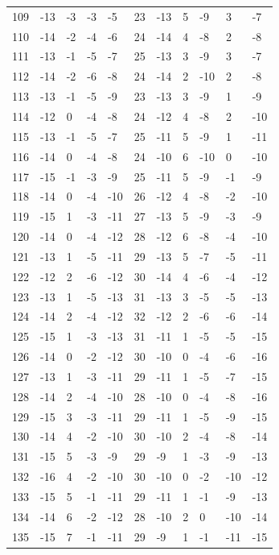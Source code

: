 \begin{table}[H]
\begin{tabular}{lllllllllll}
109 & -13 & -3 & -3 & -5 & 23 & -13 & 5 & -9 & 3 & -7 \\
110 & -14 & -2 & -4 & -6 & 24 & -14 & 4 & -8 & 2 & -8 \\
111 & -13 & -1 & -5 & -7 & 25 & -13 & 3 & -9 & 3 & -7 \\
112 & -14 & -2 & -6 & -8 & 24 & -14 & 2 & -10 & 2 & -8 \\
113 & -13 & -1 & -5 & -9 & 23 & -13 & 3 & -9 & 1 & -9 \\
114 & -12 & 0 & -4 & -8 & 24 & -12 & 4 & -8 & 2 & -10 \\
115 & -13 & -1 & -5 & -7 & 25 & -11 & 5 & -9 & 1 & -11 \\
116 & -14 & 0 & -4 & -8 & 24 & -10 & 6 & -10 & 0 & -10 \\
117 & -15 & -1 & -3 & -9 & 25 & -11 & 5 & -9 & -1 & -9 \\
118 & -14 & 0 & -4 & -10 & 26 & -12 & 4 & -8 & -2 & -10 \\
119 & -15 & 1 & -3 & -11 & 27 & -13 & 5 & -9 & -3 & -9 \\
120 & -14 & 0 & -4 & -12 & 28 & -12 & 6 & -8 & -4 & -10 \\
121 & -13 & 1 & -5 & -11 & 29 & -13 & 5 & -7 & -5 & -11 \\
122 & -12 & 2 & -6 & -12 & 30 & -14 & 4 & -6 & -4 & -12 \\
123 & -13 & 1 & -5 & -13 & 31 & -13 & 3 & -5 & -5 & -13 \\
124 & -14 & 2 & -4 & -12 & 32 & -12 & 2 & -6 & -6 & -14 \\
125 & -15 & 1 & -3 & -13 & 31 & -11 & 1 & -5 & -5 & -15 \\
126 & -14 & 0 & -2 & -12 & 30 & -10 & 0 & -4 & -6 & -16 \\
127 & -13 & 1 & -3 & -11 & 29 & -11 & 1 & -5 & -7 & -15 \\
128 & -14 & 2 & -4 & -10 & 28 & -10 & 0 & -4 & -8 & -16 \\
129 & -15 & 3 & -3 & -11 & 29 & -11 & 1 & -5 & -9 & -15 \\
130 & -14 & 4 & -2 & -10 & 30 & -10 & 2 & -4 & -8 & -14 \\
131 & -15 & 5 & -3 & -9 & 29 & -9 & 1 & -3 & -9 & -13 \\
132 & -16 & 4 & -2 & -10 & 30 & -10 & 0 & -2 & -10 & -12 \\
133 & -15 & 5 & -1 & -11 & 29 & -11 & 1 & -1 & -9 & -13 \\
134 & -14 & 6 & -2 & -12 & 28 & -10 & 2 & 0 & -10 & -14 \\
135 & -15 & 7 & -1 & -11 & 29 & -9 & 1 & -1 & -11 & -15 \\

\end{tabular}
\end{table}
